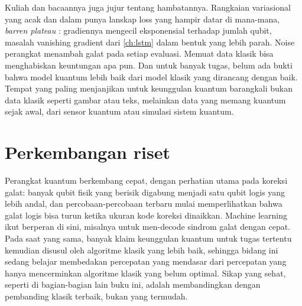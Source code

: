 Kuliah dan bacaannya juga jujur tentang hambatannya. Rangkaian variasional yang acak dan dalam punya lanskap loss yang hampir datar di
mana-mana, \emph{barren plateau} \citep{mcclean2018}: gradiennya mengecil eksponensial terhadap jumlah qubit, masalah vanishing gradient
dari \cref{ch:lstm} dalam bentuk yang lebih parah. Noise perangkat menambah galat pada setiap evaluasi. Memuat data klasik bisa
menghabiskan keuntungan apa pun. Dan untuk banyak tugas, belum ada bukti bahwa model kuantum lebih baik dari model klasik yang
dirancang dengan baik. Tempat yang paling menjanjikan untuk keunggulan kuantum barangkali bukan data klasik seperti gambar atau teks,
melainkan data yang memang kuantum sejak awal, dari sensor kuantum atau simulasi sistem kuantum.

\section{Perkembangan riset}

Perangkat kuantum berkembang cepat, dengan perhatian utama pada koreksi galat: banyak qubit fisik yang berisik digabung menjadi
satu qubit logis yang lebih andal, dan percobaan-percobaan terbaru mulai memperlihatkan bahwa galat logis bisa turun ketika ukuran
kode koreksi dinaikkan. Machine learning ikut berperan di sini, misalnya untuk men-decode sindrom galat dengan cepat. Pada saat yang
sama, banyak klaim keunggulan kuantum untuk tugas tertentu kemudian disusul oleh algoritme klasik yang lebih baik, sehingga bidang
ini sedang belajar membedakan percepatan yang mendasar dari percepatan yang hanya mencerminkan algoritme klasik yang belum optimal.
Sikap yang sehat, seperti di bagian-bagian lain buku ini, adalah membandingkan dengan pembanding klasik terbaik, bukan yang
termudah.

